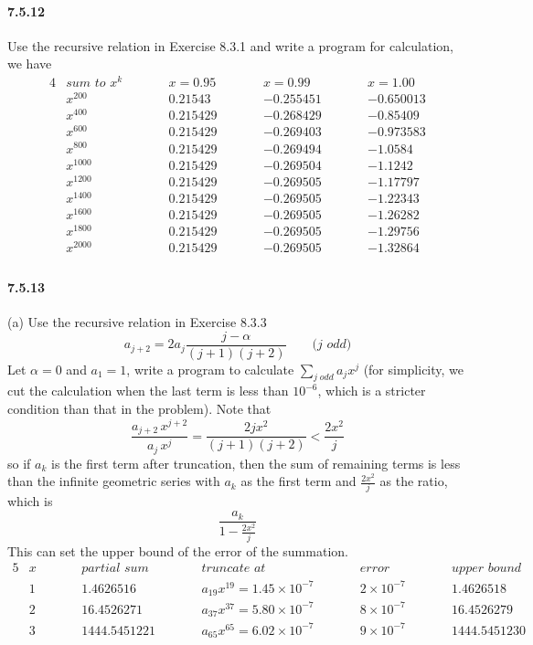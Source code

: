 \documentclass[a4paper]{article}
\begin{document}
\paragraph{7.5.12}
Use the recursive relation in Exercise 8.3.1 and write a program for calculation, we have 
\begin{alignat*}{4}
    & \textit{sum to } x^k\qquad && x=0.95\qquad && x=0.99\qquad && x=1.00
    \\
    & x^{200}\qquad && 0.21543\qquad && -0.255451\qquad && -0.650013 \\
    & x^{400}\qquad && 0.215429\qquad && -0.268429\qquad && -0.85409 \\
    & x^{600}\qquad && 0.215429\qquad && -0.269403\qquad && -0.973583 \\
    & x^{800}\qquad && 0.215429\qquad && -0.269494\qquad && -1.0584 \\
    & x^{1000}\qquad && 0.215429\qquad && -0.269504\qquad && -1.1242 \\
    & x^{1200}\qquad && 0.215429\qquad && -0.269505\qquad && -1.17797 \\
    & x^{1400}\qquad && 0.215429\qquad && -0.269505\qquad && -1.22343 \\
    & x^{1600}\qquad && 0.215429\qquad && -0.269505\qquad && -1.26282 \\
    & x^{1800}\qquad && 0.215429\qquad && -0.269505\qquad && -1.29756 \\
    & x^{2000}\qquad && 0.215429\qquad && -0.269505\qquad && -1.32864 \\
\end{alignat*}

\paragraph{7.5.13}
(a)
Use the recursive relation in Exercise 8.3.3
\[
a_{j+2}=2a_j\frac{j-\alpha}{(j+1)(j+2)}\qquad\textit{($j$ odd)}
\]
Let $\alpha=0$ and $a_1=1$, write a program to calculate $\sum_{j\;odd}a_jx^j$ (for simplicity, we cut the calculation when the last term is less than $10^{-6}$, which is a stricter condition than that in the problem). Note that 
\[
\frac{a_{j+2}\,x^{j+2}}{a_j\,x^j}=\frac{2jx^2}{(j+1)(j+2)}<\frac{2x^2}{j}
\]
so if $a_k$ is the first term after truncation, then the sum of remaining terms is less than the infinite geometric series with $a_k$ as the first term and $\frac{2x^2}{j}$ as the ratio, which is 
\[
\frac{a_k}{1-\frac{2x^2}{j}}
\]
This can set the upper bound of the error of the summation.
\begin{alignat*}{5}
    & x && \textit{partial sum}\qquad && \textit{truncate at}\qquad && \textit{error} && \textit{upper bound}\\
    & 1\qquad && 1.4626516\qquad && a_{19}x^{19}=1.45\times10^{-7}\qquad && 2\times10^{-7}\qquad && 1.4626518\\
    & 2\qquad && 16.4526271\qquad && a_{37}x^{37}=5.80\times10^{-7}\qquad && 8\times10^{-7}\qquad && 16.4526279\\
    & 3\qquad && 1444.5451221\qquad && a_{65}x^{65}=6.02\times10^{-7}\qquad && 9\times10^{-7}\qquad && 1444.5451230
\end{alignat*}
\end{document}
